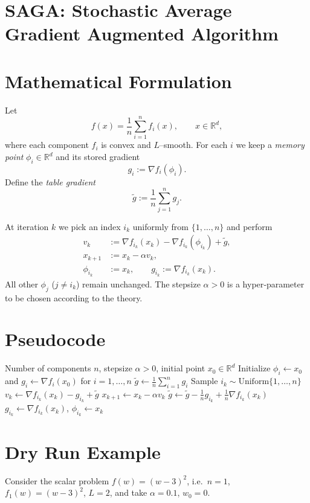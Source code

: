 \documentclass{article}
\newcommand{\R}{\mathbb{R}}
\begin{document}
\section*{SAGA: Stochastic Average Gradient Augmented Algorithm}

\section*{Mathematical Formulation}
Let 
\[
f(x)=\frac{1}{n}\sum_{i=1}^{n}f_i(x),\qquad x\in\R^{d},
\]
where each component $f_i$ is convex and $L$–smooth.  
For each $i$ we keep a \emph{memory point} $\phi_i\in\R^{d}$ and its stored gradient
\[
g_i:=\nabla f_i(\phi_i).
\]
Define the \emph{table gradient}
\[
\tilde g:=\frac{1}{n}\sum_{j=1}^{n} g_j .
\]

At iteration $k$ we pick an index $i_k$ uniformly from $\{1,\dots ,n\}$ and perform
\begin{align}
v_k &:= \nabla f_{i_k}(x_k)-\nabla f_{i_k}(\phi_{i_k})+\tilde g, \tag{1}\\
x_{k+1} &:= x_k-\alpha v_k, \tag{2}\\
\phi_{i_k}&:=x_k,\qquad g_{i_k}:=\nabla f_{i_k}(x_k). \tag{3}
\end{align}
All other $\phi_j$ ($j\neq i_k$) remain unchanged.  
The stepsize $\alpha>0$ is a hyper‑parameter to be chosen according to the theory.

\section*{Pseudocode}
\begin{algorithm}[H]
\caption{SAGA}
\begin{algorithmic}[1]
\Require Number of components $n$, stepsize $\alpha>0$, initial point $x_0\in\R^{d}$
\State Initialize $\phi_i\gets x_0$ and $g_i\gets \nabla f_i(x_0)$ for $i=1,\dots,n$
\State $\tilde g\gets \frac1n\sum_{i=1}^{n} g_i$
    \State Sample $i_k\sim\text{Uniform}\{1,\dots,n\}$
    \State $v_k \gets \nabla f_{i_k}(x_k)-g_{i_k}+\tilde g$
    \State $x_{k+1}\gets x_k-\alpha v_k$
    \State $\tilde g \gets \tilde g -\frac{1}{n}g_{i_k}+ \frac{1}{n}\nabla f_{i_k}(x_k)$
    \State $g_{i_k}\gets \nabla f_{i_k}(x_k)$,\; $\phi_{i_k}\gets x_k$
\EndFor
\end{algorithmic}
\end{algorithm}

\section*{Dry Run Example}
Consider the scalar problem $f(w)=(w-3)^2$, i.e.\ $n=1$, $f_1(w)=(w-3)^2$, $L=2$, and take $\alpha=0.1$, $w_0=0$.
\end{document}
